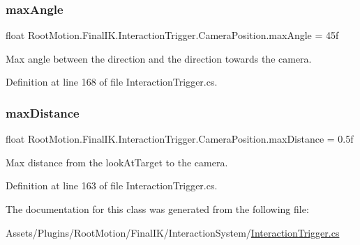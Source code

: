 \subsubsection{\texorpdfstring{max\+Angle}{maxAngle}}
{\footnotesize\ttfamily float Root\+Motion.\+Final\+I\+K.\+Interaction\+Trigger.\+Camera\+Position.\+max\+Angle = 45f}



Max angle between the direction and the direction towards the camera. 



Definition at line 168 of file Interaction\+Trigger.\+cs.

\mbox{\label{class_root_motion_1_1_final_i_k_1_1_interaction_trigger_1_1_camera_position_a531e9c3c0f8e117d17ac32a4251170d7}} 
\subsubsection{\texorpdfstring{max\+Distance}{maxDistance}}
{\footnotesize\ttfamily float Root\+Motion.\+Final\+I\+K.\+Interaction\+Trigger.\+Camera\+Position.\+max\+Distance = 0.\+5f}



Max distance from the look\+At\+Target to the camera. 



Definition at line 163 of file Interaction\+Trigger.\+cs.



The documentation for this class was generated from the following file\+:\begin{DoxyCompactItemize}
\item 
Assets/\+Plugins/\+Root\+Motion/\+Final\+I\+K/\+Interaction\+System/\mbox{\hyperlink{_interaction_trigger_8cs}{Interaction\+Trigger.\+cs}}\end{DoxyCompactItemize}
